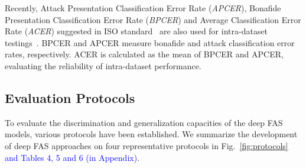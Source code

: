 \documentclass[10pt,journal,compsoc]{IEEEtran}
\begin{document}
Recently, Attack Presentation Classification Error Rate (\textit{APCER}), Bonafide Presentation Classification Error Rate (\textit{BPCER}) and Average Classification Error Rate (\textit{ACER}) suggested in ISO standard~\cite{iso2017information} are also used for intra-dataset testings~\cite{Boulkenafet2017OULU,Liu2018Learning}. BPCER and APCER measure bonafide and attack classification error rates, respectively. ACER is calculated as the mean of BPCER and APCER, evaluating the reliability of intra-dataset performance. 





\subsection{Evaluation Protocols}
\label{sec:protocols}



To evaluate the discrimination and generalization capacities of the deep FAS models, various protocols have been established. We summarize the development of deep FAS approaches on four representative protocols in Fig.~\ref{fig:protocols} \textcolor{blue}{and Tables 4, 5 and 6 (in Appendix)}.


\vspace{0.3em}
\end{document}
